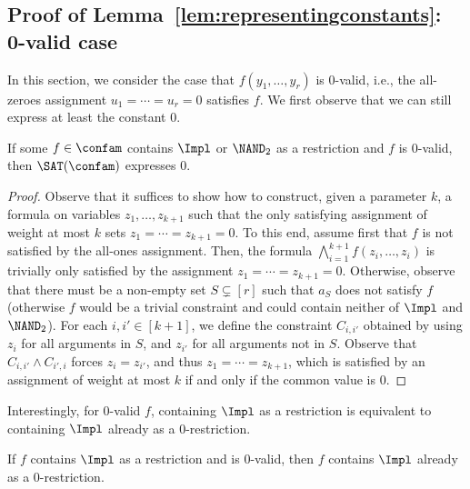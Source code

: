 \subsection{Proof of Lemma~\ref{lem:representingconstants}: 0-valid case}
\label{sec:0valid}
%
In this section, we consider the case that $f(y_1,\dots,y_r)$ is $0$-valid, i.e., the all-zeroes assignment $u_1=\cdots = u_r= 0$ satisfies $f$. We first observe that we can still express at least the constant 0.
%
\begin{lem}\label{lem:0validexpresses0}
If some $f\in \confam$ contains $\Impl$ or $\NAND_2$ as a restriction and $f$ is 0-valid, then $\SAT(\confam)$ expresses $0$.
\end{lem}
\begin{proof}
Observe that it suffices to show how to construct, given a parameter $k$, a formula on variables $z_1,\dots, z_{k+1}$ such that the only satisfying assignment of weight at most $k$ sets $z_1=\cdots = z_{k+1}=0$.
%
To this end, assume first that $f$ is not satisfied by the all-ones assignment. Then, the formula $\bigwedge_{i=1}^{k+1} f(z_i,\dots,z_i)$ is trivially only satisfied by the assignment $z_1=\cdots = z_{k+1} = 0$.
%
Otherwise, observe that there must be a non-empty set $S\subsetneq [r]$ such that $a_S$ does not satisfy $f$ (otherwise $f$ would be a trivial constraint and could contain neither of $\Impl$ and $\NAND_2$). For each $i,i'\in [k+1]$, we define the constraint $C_{i,i'}$ obtained by using $z_i$ for all arguments in $S$, and $z_{i'}$ for all arguments not in $S$. Observe that $C_{i,i'} \wedge C_{i',i}$ forces $z_i = z_{i'}$, and thus $z_1= \cdots = z_{k+1}$, which is satisfied by an assignment of weight at most $k$ if and only if the common value is $0$. 
\end{proof}
%
Interestingly, for $0$-valid $f$, containing $\Impl$ as a restriction is equivalent to containing $\Impl$ already as a $0$-restriction.
%
\begin{lem}\label{lem:Implas0restr}
If $f$ contains $\Impl$ as a restriction and is $0$-valid, then $f$ contains $\Impl$ already as a $0$-restriction.
\end{lem}
